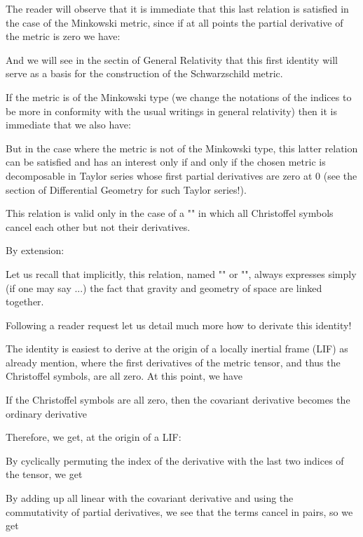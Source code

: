 	The reader will observe that it is immediate that this last relation is satisfied in the case of the Minkowski metric, since if at all points the partial derivative of the metric is zero we have:
	
	And we will see in the sectin of General Relativity that this first identity will serve as a basis for the construction of the Schwarzschild metric.

	If the metric is of the Minkowski type (we change the notations of the indices to be more in conformity with the usual writings in general relativity) then it is immediate that we also have:
	
	But in the case where the metric is not of the Minkowski type, this latter relation can be satisfied and has an interest only if and only if the chosen metric is decomposable in Taylor series whose first partial derivatives are zero at $0$ (see the section of Differential Geometry for such Taylor series!).

	This relation is valid only in the case of a "" in which all Christoffel symbols cancel each other but not their derivatives.

	By extension:
	
	Let us recall that implicitly, this relation, named "\index{}" or "", always expresses simply (if one may say ...) the fact that gravity and geometry of space are linked together.

	Following a reader request let us detail much more how to derivate this identity!

	The identity is easiest to derive at the origin of a locally inertial frame (LIF) as already mention, where the first derivatives of the metric tensor, and thus the Christoffel symbols, are all zero. At this point, we have
	
	If the Christoffel symbols are all zero, then the covariant derivative becomes the ordinary derivative
	
	Therefore, we get, at the origin of a LIF:
	
	By cyclically permuting the index of the derivative with the last two indices of the tensor, we get
	
	By adding up all linear with the covariant derivative and using the commutativity of partial derivatives, we see that the terms cancel in pairs, so we get
	
